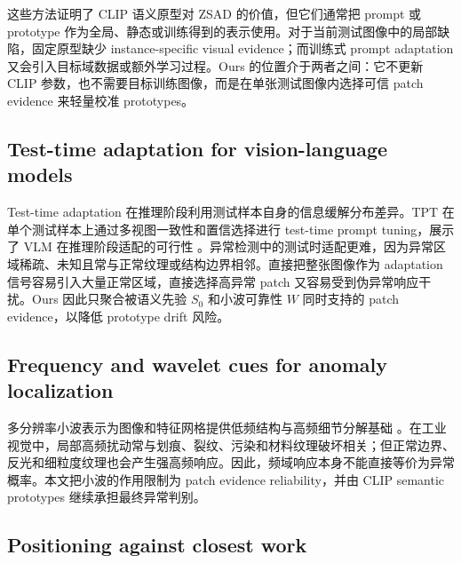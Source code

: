 \documentclass[10pt,a4paper,fontset=none]{ctexart}
\begin{document}
这些方法证明了 CLIP 语义原型对 ZSAD 的价值，但它们通常把 prompt 或 prototype 作为全局、静态或训练得到的表示使用。对于当前测试图像中的局部缺陷，固定原型缺少 instance-specific visual evidence；而训练式 prompt adaptation 又会引入目标域数据或额外学习过程。Ours 的位置介于两者之间：它不更新 CLIP 参数，也不需要目标训练图像，而是在单张测试图像内选择可信 patch evidence 来轻量校准 prototypes。

\subsection{Test-time adaptation for vision-language models}

Test-time adaptation 在推理阶段利用测试样本自身的信息缓解分布差异。TPT 在单个测试样本上通过多视图一致性和置信选择进行 test-time prompt tuning，展示了 VLM 在推理阶段适配的可行性 \cite{shu2022tpt}。异常检测中的测试时适配更难，因为异常区域稀疏、未知且常与正常纹理或结构边界相邻。直接把整张图像作为 adaptation 信号容易引入大量正常区域，直接选择高异常 patch 又容易受到伪异常响应干扰。Ours 因此只聚合被语义先验 $S_0$ 和小波可靠性 $W$ 同时支持的 patch evidence，以降低 prototype drift 风险。

\subsection{Frequency and wavelet cues for anomaly localization}

多分辨率小波表示为图像和特征网格提供低频结构与高频细节分解基础 \cite{daubechies1988orthonormal,mallat1989theory}。在工业视觉中，局部高频扰动常与划痕、裂纹、污染和材料纹理破坏相关；但正常边界、反光和细粒度纹理也会产生强高频响应。因此，频域响应本身不能直接等价为异常概率。本文把小波的作用限制为 patch evidence reliability，并由 CLIP semantic prototypes 继续承担最终异常判别。

\subsection{Positioning against closest work}
\end{document}
